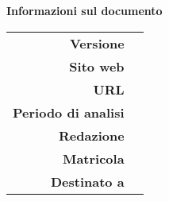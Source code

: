 \begin{center}
\textbf{Informazioni sul documento} \\ \vspace{0.5em}
\small
\begin{tabular}{r|l}
	\textbf{Versione}	& 	\version\\
	\textbf{Sito web}	&\sitename\\
	\textbf{URL}	&\siteaddress\\
	\textbf{Periodo di analisi}	&\period\\
	\textbf{Redazione}	&\editorialstaff\\
	\textbf{Matricola}	&\matricola\\
	\textbf{Destinato a} 			& 	\addressedto
\end{tabular}
\end{center}
\normalsize
